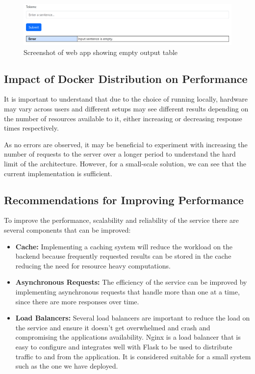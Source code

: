 \documentclass{surreydissertation}
\begin{document}
\begin{figure}
    \centering
    \includegraphics[width=1\textwidth]{Figures/emptyfrontend.png}
    \caption{Screenshot of web app showing empty output table}
    \label{fig:reset}
 \end{figure}

\subsection{Impact of Docker Distribution on Performance}
It is important to understand that due to the choice of running locally, hardware may vary across users and different setups may see different results depending on the number of resources available to it, either increasing or decreasing response times respectively. 

As no errors are observed, it may be beneficial to experiment with increasing the number of requests to the server over a longer period to understand the hard limit of the architecture. However, for a small-scale solution, we can see that the current implementation is sufficient.

\subsection{Recommendations for Improving Performance}
To improve the performance, scalability and reliability of the service there are several components that can be improved:

\begin{itemize}
    \item \textbf{Cache:} Implementing a caching system will reduce the workload on the backend because frequently requested results can be stored in the cache reducing the need for resource heavy computations. 
    \item \textbf{Asynchronous Requests:} The efficiency of the service can be improved by implementing asynchronous requests that handle more than one at a time, since there are more responses over time.
    \item \textbf{Load Balancers:} Several load balancers are important to reduce the load on the service and ensure it doesn't get overwhelmed and crash and compromising the applications availability. Nginx is a load balancer that is easy to configure and integrates well with Flask to be used to distribute traffic to and from the application. It is considered suitable for a small system such as the one we have deployed.
\end{itemize}
\end{document}
